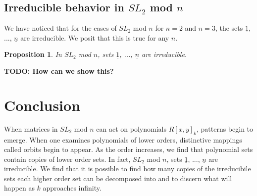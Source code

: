 \documentclass[a4paper,draft]{amsproc}
\theoremstyle{plain}
\newtheorem{prop}{Proposition}[section]
\theoremstyle{definition}
\theoremstyle{remark}
\numberwithin{equation}{section}
\begin{document}
\subsection{Irreducible behavior in $SL_{2}$ mod $n$}
We have noticed that for the cases of $SL_{2}$ mod $n$ for $n = 2$ and $n = 3$, the sets $\underline{1}$, ..., $\underline{n}$ are irreducible. We posit that this is true for any $n$. 
\begin{prop}
 In $SL_{2}$ mod $n$, sets $\underline{1}$, ..., $\underline{n}$ are irreducible. 
\end{prop}
\textbf{TODO: How can we show this?}

\section{Conclusion}
When matrices in $SL_{2}$ mod $n$ can act on polynomials $R[x,y]_{k}$, patterns begin to emerge. When one examines polynomials of lower orders, distinctive mappings called orbits begin to appear. As the order increases, we find that polynomial sets contain copies of lower order sets.  In fact, $SL_{2}$ mod $n$, sets $\underline{1}$, ..., $\underline{n}$ are irreducible. We find that it is possible to find how many copies of the irreducibile sets each higher order set can be decomposed into and to discern what will happen as $k$ approaches infinity.

\end{document}
